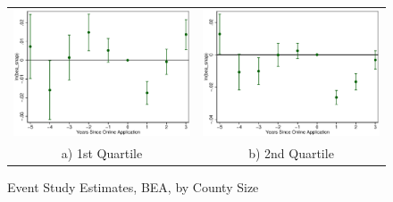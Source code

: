 \documentclass[11pt,letterpaper]{article}
\begin{document}
\begin{figure}\caption{Event Study Estimates, BEA, by County Size}
\begin{tabular}{cc}
\includegraphics[scale=0.57]{tabfig/evstu_size1_bea_snap_one_yrcfcttr_5_3}&\includegraphics[scale=0.57]{tabfig/evstu_size2_bea_snap_one_yrcfcttr_5_3}\\
a) 1st Quartile&b) 2nd Quartile\\

\end{tabular}
\end{figure}
\end{document}
